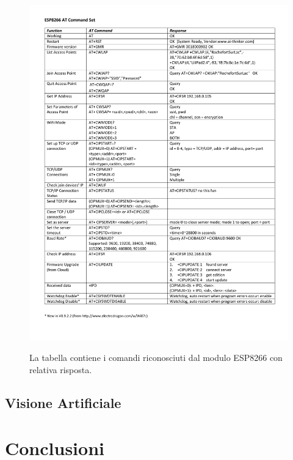 \documentclass [11pt ,a4paper ,twoside ]{article}
\begin{document}
\begin{figure}
	\centering
		\hspace*{-2cm}\includegraphics[width=1.30\textwidth]{Images/CommandsSet.pdf}
	\label{fig:commands}
	\caption{La tabella contiene i comandi riconosciuti dal modulo ESP8266 con relativa risposta.}
\end{figure}



\subsection{Visione Artificiale}



\section{Conclusioni}
\end{document}
